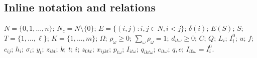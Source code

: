 \documentclass[10pt]{article}
\begin{document}
\subsection*{Inline notation and relations}
$N=\{0,1,\ldots,n\}$; $N_c=N\setminus\{0\}$; $E=\{(i,j):i,j\in N,i<j\}$; $\delta(i)$; $E(S)$; $S$; $T=\{1,\ldots,\ell\}$; $K=\{1,\ldots,m\}$; $\Omega$; $\rho_\omega\geq0$; $\sum_\omega\rho_\omega=1$; $d_{it\omega}\geq0$; $C$; $Q$; $L_i$; $I_i^0$; $u$; $f$; $c_{ij}$; $h_i$; $\sigma_i$; $y_t$; $z_{ikt}$; $k$; $t$; $i$; $z_{0kt}$; $x_{ijkt}$; $p_{t\omega}$; $I_{it\omega}$; $q_{ikt\omega}$; $e_{it\omega}$; $q,e$; $I_{i0\omega}=I_i^0$.
\end{document}
